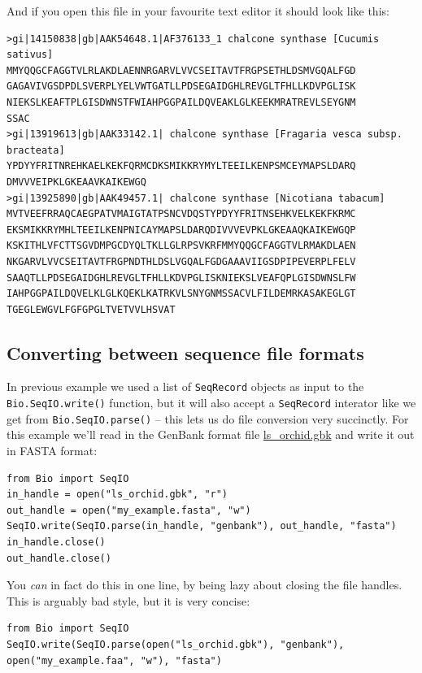 \documentclass{report}
\begin{document}
\noindent And if you open this file in your favourite text editor it should look like this:

\begin{verbatim}
>gi|14150838|gb|AAK54648.1|AF376133_1 chalcone synthase [Cucumis sativus]
MMYQQGCFAGGTVLRLAKDLAENNRGARVLVVCSEITAVTFRGPSETHLDSMVGQALFGD
GAGAVIVGSDPDLSVERPLYELVWTGATLLPDSEGAIDGHLREVGLTFHLLKDVPGLISK
NIEKSLKEAFTPLGISDWNSTFWIAHPGGPAILDQVEAKLGLKEEKMRATREVLSEYGNM
SSAC
>gi|13919613|gb|AAK33142.1| chalcone synthase [Fragaria vesca subsp. bracteata]
YPDYYFRITNREHKAELKEKFQRMCDKSMIKKRYMYLTEEILKENPSMCEYMAPSLDARQ
DMVVVEIPKLGKEAAVKAIKEWGQ
>gi|13925890|gb|AAK49457.1| chalcone synthase [Nicotiana tabacum]
MVTVEEFRRAQCAEGPATVMAIGTATPSNCVDQSTYPDYYFRITNSEHKVELKEKFKRMC
EKSMIKKRYMHLTEEILKENPNICAYMAPSLDARQDIVVVEVPKLGKEAAQKAIKEWGQP
KSKITHLVFCTTSGVDMPGCDYQLTKLLGLRPSVKRFMMYQQGCFAGGTVLRMAKDLAEN
NKGARVLVVCSEITAVTFRGPNDTHLDSLVGQALFGDGAAAVIIGSDPIPEVERPLFELV
SAAQTLLPDSEGAIDGHLREVGLTFHLLKDVPGLISKNIEKSLVEAFQPLGISDWNSLFW
IAHPGGPAILDQVELKLGLKQEKLKATRKVLSNYGNMSSACVLFILDEMRKASAKEGLGT
TGEGLEWGVLFGFGPGLTVETVVLHSVAT
\end{verbatim}

\subsection{Converting between sequence file formats}

In previous example we used a list of \verb|SeqRecord| objects as input to the \verb|Bio.SeqIO.write()| function, but it will also accept a \verb|SeqRecord| interator like we get from \verb|Bio.SeqIO.parse()| -- this lets us do file conversion very succinctly. For this example we'll read in the GenBank format file \href{http://biopython.org/DIST/docs/tutorial/examples/ls_orchid.gbk}{ls\_orchid.gbk} and write it out in FASTA format:

\begin{verbatim}
from Bio import SeqIO
in_handle = open("ls_orchid.gbk", "r")
out_handle = open("my_example.fasta", "w")
SeqIO.write(SeqIO.parse(in_handle, "genbank"), out_handle, "fasta")
in_handle.close()
out_handle.close()
\end{verbatim}

You {\it can} in fact do this in one line, by being lazy about closing the file handles. This is arguably bad style, but it is very concise:

\begin{verbatim}
from Bio import SeqIO
SeqIO.write(SeqIO.parse(open("ls_orchid.gbk"), "genbank"), open("my_example.faa", "w"), "fasta")
\end{verbatim}
\end{document}
